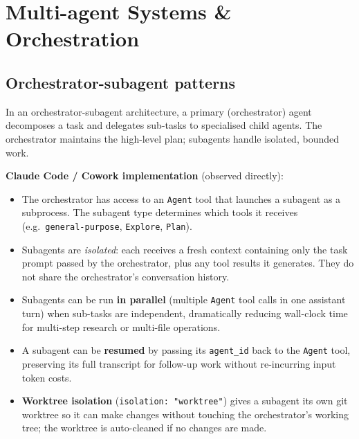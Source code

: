 
\section{Multi-agent Systems \& Orchestration}

\subsection{Orchestrator-subagent patterns}

In an orchestrator-subagent architecture, a primary (orchestrator) agent decomposes a
task and delegates sub-tasks to specialised child agents. The orchestrator maintains
the high-level plan; subagents handle isolated, bounded work.

\textbf{Claude Code / Cowork implementation} (observed directly):

\begin{itemize}
  \item The orchestrator has access to an \texttt{Agent} tool that launches a subagent
    as a subprocess. The subagent type determines which tools it receives
    (e.g.\ \texttt{general-purpose}, \texttt{Explore}, \texttt{Plan}).

  \item Subagents are \emph{isolated}: each receives a fresh context containing only
    the task prompt passed by the orchestrator, plus any tool results it generates.
    They do not share the orchestrator's conversation history.

  \item Subagents can be run \textbf{in parallel} (multiple \texttt{Agent} tool calls
    in one assistant turn) when sub-tasks are independent, dramatically reducing
    wall-clock time for multi-step research or multi-file operations.

  \item A subagent can be \textbf{resumed} by passing its \texttt{agent\_id} back to
    the \texttt{Agent} tool, preserving its full transcript for follow-up work without
    re-incurring input token costs.

  \item \textbf{Worktree isolation} (\texttt{isolation: "worktree"}) gives a subagent
    its own git worktree so it can make changes without touching the orchestrator's
    working tree; the worktree is auto-cleaned if no changes are made.
\end{itemize}

